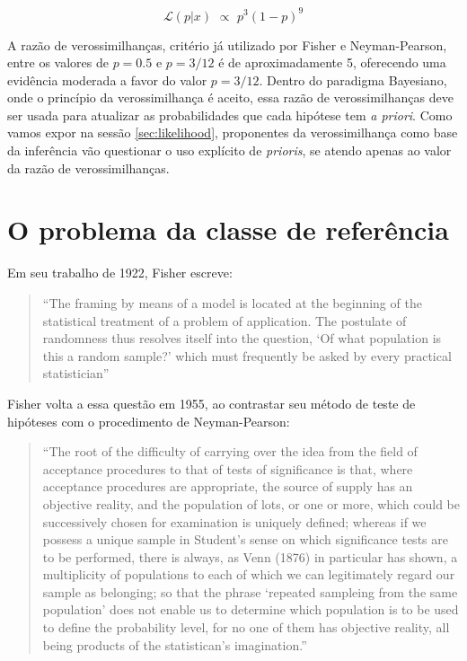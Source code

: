 \begin{equation}
	\mathcal{L}(p|x) \,\, \propto \,\, p^3(1-p)^9
\end{equation}

A razão de verossimilhanças, critério já utilizado por Fisher e Neyman-Pearson, entre os valores de $p=0.5$ e $p=3/12$ é de 
aproximadamente 5, oferecendo uma evidência moderada a favor do valor $p=3/12$. Dentro do paradigma Bayesiano, onde o princípio
da verossimilhança é aceito, essa razão de verossimilhanças deve ser usada para atualizar as probabilidades que cada hipótese
tem {\em a priori}. Como vamos expor na sessão \ref{sec:likelihood}, proponentes da verossimilhança como base da inferência
vão questionar o uso explícito de {\em prioris}, se atendo apenas ao valor da razão de verossimilhanças.

\section{O problema da classe de referência}\label{sec:classref}

Em seu trabalho de 1922, Fisher escreve:

\begin{quote}
``The framing by means of a model is located at the beginning of the
statistical treatment of a problem of application. The postulate of randomness thus resolves itself into the 
question, `Of what population is this a random sample?' which must frequently be asked by every practical
statistician''\citep{Fisher1922}
\end{quote}

Fisher volta a essa questão em 1955, ao contrastar seu método de teste de hipóteses com o procedimento de Neyman-Pearson:

\begin{quote}
``The root of the difficulty of carrying over the idea from the field of acceptance procedures to that of tests of significance
is that, where acceptance procedures are appropriate, the source of supply has an objective reality, and the population
of lots, or one or more, which could be successively chosen for examination is uniquely defined; whereas if we possess a unique
sample in Student's sense on which significance tests are to be performed, there is always, as Venn (1876) in particular has
shown, a multiplicity of populations to each of which we can legitimately regard our sample as belonging; so that the phrase
`repeated sampleing from the same population' does not enable us to determine which population is to be used to define the
probability level, for no one of them has objective reality, all being products of the statistican's imagination.''
\citep{Fisher1955}
\end{quote}

